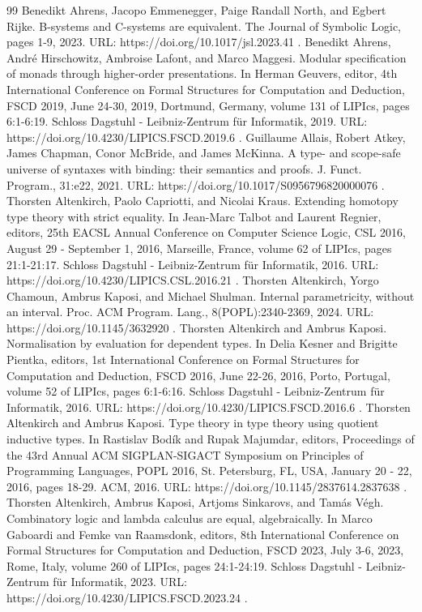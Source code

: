 \begin{thebibliography}{99}
 Benedikt Ahrens, Jacopo Emmenegger, Paige Randall North, and Egbert Rijke. B-systems and C-systems are equivalent. The Journal of Symbolic Logic, pages 1-9, 2023. URL: https://doi.org/10.1017/jsl.2023.41 .
 Benedikt Ahrens, André Hirschowitz, Ambroise Lafont, and Marco Maggesi. Modular specification of monads through higher-order presentations. In Herman Geuvers, editor, 4th International Conference on Formal Structures for Computation and Deduction, FSCD 2019, June 24-30, 2019, Dortmund, Germany, volume 131 of LIPIcs, pages 6:1-6:19. Schloss Dagstuhl - Leibniz-Zentrum für Informatik, 2019. URL: https://doi.org/10.4230/LIPICS.FSCD.2019.6 .
 Guillaume Allais, Robert Atkey, James Chapman, Conor McBride, and James McKinna. A type- and scope-safe universe of syntaxes with binding: their semantics and proofs. J. Funct. Program., 31:e22, 2021. URL: https://doi.org/10.1017/S0956796820000076 .
 Thorsten Altenkirch, Paolo Capriotti, and Nicolai Kraus. Extending homotopy type theory with strict equality. In Jean-Marc Talbot and Laurent Regnier, editors, 25th EACSL Annual Conference on Computer Science Logic, CSL 2016, August 29 - September 1, 2016, Marseille, France, volume 62 of LIPIcs, pages 21:1-21:17. Schloss Dagstuhl - Leibniz-Zentrum für Informatik, 2016. URL: https://doi.org/10.4230/LIPICS.CSL.2016.21 .
 Thorsten Altenkirch, Yorgo Chamoun, Ambrus Kaposi, and Michael Shulman. Internal parametricity, without an interval. Proc. ACM Program. Lang., 8(POPL):2340-2369, 2024. URL: https://doi.org/10.1145/3632920 .
 Thorsten Altenkirch and Ambrus Kaposi. Normalisation by evaluation for dependent types. In Delia Kesner and Brigitte Pientka, editors, 1st International Conference on Formal Structures for Computation and Deduction, FSCD 2016, June 22-26, 2016, Porto, Portugal, volume 52 of LIPIcs, pages 6:1-6:16. Schloss Dagstuhl - Leibniz-Zentrum für Informatik, 2016. URL: https://doi.org/10.4230/LIPICS.FSCD.2016.6 .
 Thorsten Altenkirch and Ambrus Kaposi. Type theory in type theory using quotient inductive types. In Rastislav Bodík and Rupak Majumdar, editors, Proceedings of the 43rd Annual ACM SIGPLAN-SIGACT Symposium on Principles of Programming Languages, POPL 2016, St. Petersburg, FL, USA, January 20 - 22, 2016, pages 18-29. ACM, 2016. URL: https://doi.org/10.1145/2837614.2837638 .
 Thorsten Altenkirch, Ambrus Kaposi, Artjoms Sinkarovs, and Tamás Végh. Combinatory logic and lambda calculus are equal, algebraically. In Marco Gaboardi and Femke van Raamsdonk, editors, 8th International Conference on Formal Structures for Computation and Deduction, FSCD 2023, July 3-6, 2023, Rome, Italy, volume 260 of LIPIcs, pages 24:1-24:19. Schloss Dagstuhl - Leibniz-Zentrum für Informatik, 2023. URL: https://doi.org/10.4230/LIPICS.FSCD.2023.24 .

\end{thebibliography}
